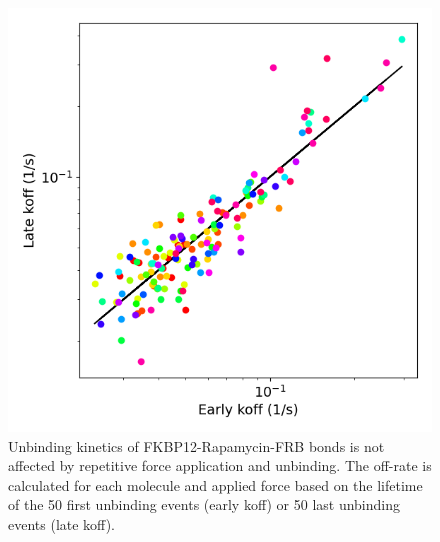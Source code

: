 \documentclass{biophys-new}
\begin{document}
\begin{figure}[hbt!]
	\centering
	\includegraphics[width=0.6\linewidth]{Figures/Maturation_Rapa.png}
	\caption{Unbinding kinetics of FKBP12-Rapamycin-FRB bonds is not affected by repetitive force application and unbinding. The off-rate is calculated for each molecule and applied force based on the lifetime of the 50 first unbinding events (early koff) or 50 last unbinding events (late koff). }
	\label{fig:maturation}
\end{figure}


\end{document}
